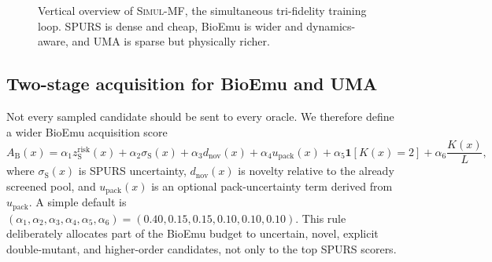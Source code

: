 \documentclass[11pt]{article}
\newcommand{\SubTB}{\ensuremath{\mathrm{SubTB}}}
\newcommand{\packunc}{\ensuremath{u_{\mathrm{pack}}}}
\newcommand{\methodI}{\textsc{Simul-MF}}
\begin{document}
\begin{figure}[p]
		\caption{Vertical overview of \methodI{}, the simultaneous tri-fidelity training loop. SPURS is dense and cheap, BioEmu is wider and dynamics-aware, and UMA is sparse but physically richer.}
		\label{fig:simultaneous}
	\end{figure}
	
	
	\subsection{Two-stage acquisition for BioEmu and UMA}
	
	Not every sampled candidate should be sent to every oracle. We therefore define a wider BioEmu acquisition score
	\begin{equation}
		\label{eq:acqbioemu}
		A_{\mathrm B}(x)=\alpha_1 z_{\mathrm S}^{\mathrm{risk}}(x)+\alpha_2 \sigma_{\mathrm S}(x)+\alpha_3 d_{\mathrm{nov}}(x)+\alpha_4 u_{\mathrm{pack}}(x)+\alpha_5 \mathbf{1}[K(x)=2]+\alpha_6 \frac{K(x)}{L},
	\end{equation}
	where $\sigma_{\mathrm S}(x)$ is SPURS uncertainty, $d_{\mathrm{nov}}(x)$ is novelty relative to the already screened pool, and $u_{\mathrm{pack}}(x)$ is an optional pack-uncertainty term derived from \packunc. A simple default is $(\alpha_1,\alpha_2,\alpha_3,\alpha_4,\alpha_5,\alpha_6)=(0.40,0.15,0.15,0.10,0.10,0.10)$. This rule deliberately allocates part of the BioEmu budget to uncertain, novel, explicit double-mutant, and higher-order candidates, not only to the top SPURS scorers.
	
\end{document}
